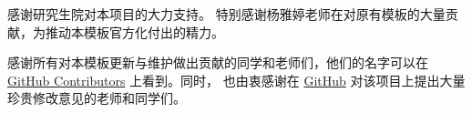 \begin{acknowledgements}

感谢研究生院对本项目的大力支持。
特别感谢杨雅婷老师在对原有模板的大量贡献，为推动本模板官方化付出的精力。

感谢所有对本模板更新与维护做出贡献的同学和老师们，他们的名字可以在\href{https://github.com/BITNP/BIThesis/graphs/contributors}{GitHub
  Contributors} 上看到。同时， 也由衷感谢在 \href{https://github.com/BITNP/BIThesis/issues?q=}{GitHub}
对该项目上提出大量珍贵修改意见的老师和同学们。


\end{acknowledgements}
